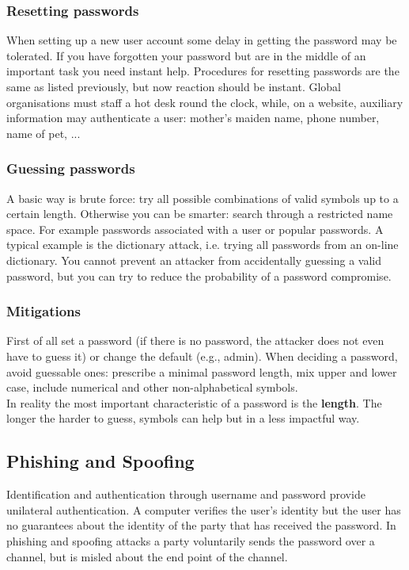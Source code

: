 \documentclass[a4paper, 10pt, titlepage]{article}
\begin{document}
\subsubsection*{Resetting passwords}
When setting up a new user account some delay in getting the
password may be tolerated. If you have forgotten your password but are in the middle of an important task you need instant help. Procedures for resetting passwords are the same as listed previously,
but now reaction should be instant. Global organisations must staff a hot desk round the clock, while, on a website, auxiliary information may authenticate a user: mother’s maiden name, phone number, name of pet, ...

\subsubsection*{Guessing passwords}
A basic way is brute force: try all possible combinations of valid symbols up to a certain length. Otherwise you can be smarter: search through a restricted name space. For example passwords associated with a user or popular passwords. A typical example is the dictionary attack, i.e. trying all passwords from an on-line dictionary. You cannot prevent an attacker from accidentally guessing a valid password, but you can try to reduce the probability of a password compromise.

\subsubsection*{Mitigations}
First of all set a password (if there is no password, the attacker does not even have to guess it) or change the default (e.g., admin). When deciding a password, avoid guessable ones: prescribe a minimal password length, mix upper and lower case, include numerical and other non-alphabetical symbols. \\
In reality the most important characteristic of a password is the \textbf{length}. The longer the harder to guess, symbols can help but in a less impactful way.

\subsection{Phishing and Spoofing}
Identification and authentication through username and password provide unilateral authentication. A computer verifies the user’s identity but the user has no guarantees about the identity of the party that has received the password. In phishing and spoofing attacks a party voluntarily sends the password over a channel, but is misled about the end point of the channel.
\end{document}
